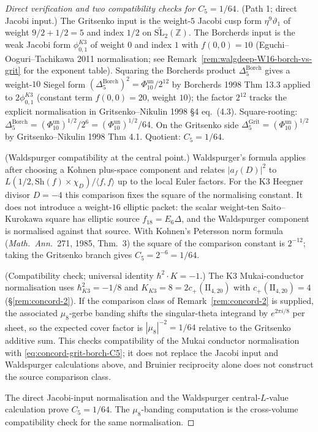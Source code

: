 \begin{proof}[Direct verification and two compatibility checks for
$C_5 = 1/64$]
\textup{(Path 1; direct Jacobi input.)}
The Gritsenko input is the weight-$5$ Jacobi cusp form
$\eta^9 \vartheta_1$ of weight $9/2 + 1/2 = 5$ and index $1/2$
on $\widetilde{\mathrm{SL}_2}(\mathbb Z)$. The Borcherds input is
the weak Jacobi form $\phi_{0,1}^{K3}$ of weight $0$ and index $1$
with $f(0, 0) = 10$ (Eguchi--Ooguri--Tachikawa 2011 normalisation;
see Remark~\ref{rem:walgdeep-W16-borch-vs-grit} for the
exponent table). Squaring the Borcherds product
$\Delta_5^{\mathrm{Borch}}$ gives a weight-$10$ Siegel form
$(\Delta_5^{\mathrm{Borch}})^2 = \Phi_{10}^{\mathrm{un}}/2^{12}$ by Borcherds
1998 Thm 13.3 applied to $2 \phi_{0,1}^{K3}$ (constant term
$f(0,0) = 20$, weight $10$); the factor $2^{12}$ tracks the
explicit normalisation in Gritsenko--Nikulin 1998 \S4 eq.~(4.3).
Square-rooting: $\Delta_5^{\mathrm{Borch}} =
(\Phi_{10}^{\mathrm{un}})^{1/2}/2^6 =
(\Phi_{10}^{\mathrm{un}})^{1/2}/64$. On the Gritsenko side
$\Delta_5^{\mathrm{Grit}} = (\Phi_{10}^{\mathrm{un}})^{1/2}$ by Gritsenko--Nikulin
1998 Thm 4.1. Quotient: $C_5 = 1/64$.

\textup{(Waldspurger compatibility at the central point.)}
Waldspurger's formula \cite{Waldspurger81} applies after choosing a
Kohnen plus-space component and relates
$|a_f(D)|^2$ to
$L(1/2,\mathrm{Sh}(f)\times\chi_D)/\langle f,f\rangle$ up to the
local Euler factors. For the K3 Heegner divisor $D=-4$ this
comparison fixes the square of the normalising constant. It does not
introduce a weight-$16$ elliptic packet: the scalar weight-ten
Saito--Kurokawa square has elliptic source
$f_{18}=E_6\Delta$, and the Waldspurger component is normalised
against that source. With Kohnen's Petersson norm formula
(\emph{Math.\ Ann.}~271, 1985, Thm.~3) the square of the comparison constant is
$2^{-12}$; taking the Gritsenko branch gives $C_5=2^{-6}=1/64$.

\textup{(Compatibility check; universal identity
$\hbar^2 \cdot K = -1$.)}
The K3 Mukai-conductor normalisation uses
$\hbar^2_{K3} = -1/8$ and
$K_{K3}=8=2c_+(\mathrm{II}_{4,20})$
with $c_+(\mathrm{II}_{4,20})=4$
(\S\ref{rem:concord-2}). If the comparison class of
Remark~\ref{rem:concord-2} is supplied, the associated
$\mu_8$-gerbe banding shifts the singular-theta integrand by
$e^{2\pi i/8}$ per sheet, so the expected cover factor is
$|\mu_8|^{-2}=1/64$ relative to the Gritsenko additive sum. This
checks compatibility of the Mukai conductor normalisation with
\eqref{eq:concord-grit-borch-C5}; it does not replace the Jacobi
input and Waldspurger calculations above, and Bruinier reciprocity
alone does not construct the source comparison class.

The direct Jacobi-input normalisation and the Waldspurger
central-$L$-value calculation prove $C_5=1/64$. The
$\mu_8$-banding computation is the cross-volume compatibility check
for the same normalisation.
\end{proof}


